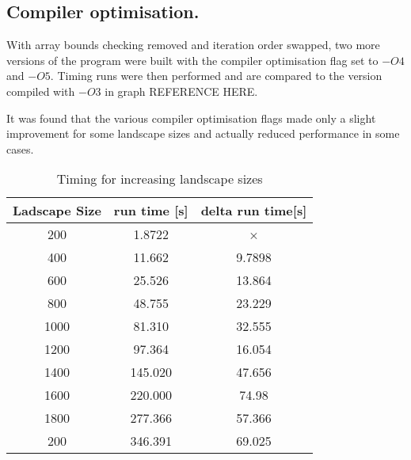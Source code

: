 \subsection{Compiler optimisation.}
\label{Compiler optimisation}

With array bounds checking removed and iteration order swapped, two more versions of the program were built with the compiler optimisation flag set to $-O4$ and $-O5$.
Timing runs were then performed and are compared to the version compiled with $-O3$ in graph REFERENCE HERE.

It was found that the various compiler optimisation flags made only a slight improvement for some landscape sizes and actually reduced performance in some cases.


\begin{table}
\caption{Timing for increasing landscape sizes}
\label{tab: Size timing}
 \begin{center}
\begin{tabular}{|c|c|c|}
\hline
Ladscape Size & run time [s] & delta run time[s]\\
\hline
200 & 1.8722 & ×\\
\hline
400 & 11.662 & 9.7898\\
\hline
600 & 25.526 & 13.864\\
\hline
800 & 48.755 & 23.229\\
\hline
1000 & 81.310 & 32.555\\
\hline
1200 & 97.364 & 16.054\\
\hline
1400 & 145.020 & 47.656\\
\hline
1600 & 220.000 & 74.98\\
\hline
1800 & 277.366 & 57.366\\
\hline
200 & 346.391 & 69.025\\
\hline
\end{tabular}
\end{center}
\end{table}




